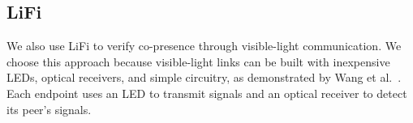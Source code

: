\documentclass[sigconf,authordraft]{acmart}
\begin{document}



\subsection{LiFi}
\label{sec:mechanism-lifi}

We also use LiFi to verify co-presence through visible-light communication.
We choose this approach because visible-light links can be built with inexpensive LEDs, optical receivers, and simple circuitry, as demonstrated by Wang et al.~\cite{wang2015low}.
Each endpoint uses an LED to transmit signals and an optical receiver to detect its peer's signals.
\end{document}
